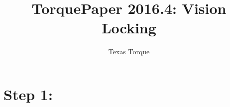 \documentclass[12pt,a4paper]{report}
\author{Texas Torque}
\title{TorquePaper 2016.4: Vision Locking}
\begin{document}
	\maketitle
	
	\chapter{Step 1:}
\end{document}
